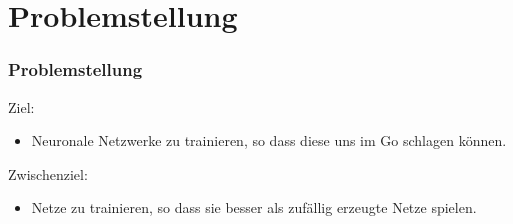 \section{Problemstellung}

\begin{frame}
    \frametitle{Problemstellung}
    Ziel:
    \begin{itemize}
        \item
            Neuronale Netzwerke zu trainieren, so dass diese uns im Go schlagen können.
    \end{itemize}    
    Zwischenziel:
    \begin{itemize}
        \item
            Netze zu trainieren, so dass sie besser als zufällig erzeugte Netze spielen.
    \end{itemize}
\end{frame}

